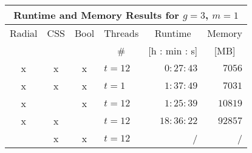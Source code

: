 \documentclass[12pt]{beamer}            %
\begin{document}
\begin{frame}
 \begin{center}
  \begin{tabular}{|c|c|c|l||r|r|}
      \cline{1-6}
      \multicolumn{6}{|c|}{Runtime and Memory Results for $g = 3$, $m = 1$} \\ \hline \hline
      Radial & CSS & Bool & Threads &  \multicolumn{1}{c}{Runtime} & \multicolumn{1}{|c|}{Memory} \\ 
             &     &      & \multicolumn{1}{c||}{\#} & \multicolumn{1}{c}{[h : min : s]} & \multicolumn{1}{|c|}{[MB]} \\ \hline\hline
      x      & x   & x    & $t = 12$  & $0:27:43$           & $7056$  \\ \hline
      x      & x   & x    & $t = 1$               & $1:37:49$           & $7031$  \\ \hline
      x      &     & x    & $t = 12$  & $1:25:39$           & $10819$ \\ \hline
      x      & x   &      & $t = 12$  & $18:36:22$          & $92857$ \\ \hline
             & x   & x    & $t = 12$  & /                   & /       \\ \hline
  \end{tabular}
\end{center}
\end{frame}
\end{document}
